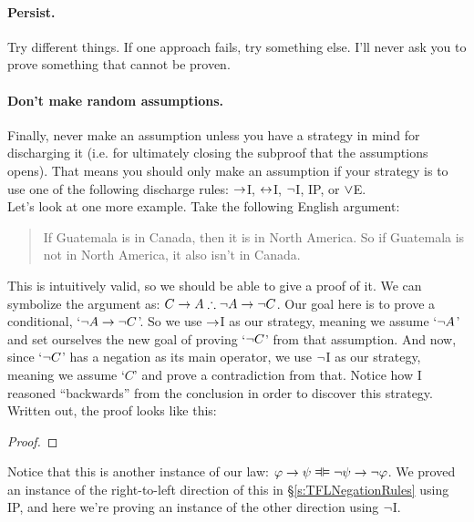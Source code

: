 \paragraph{Persist.}
Try different things. If one approach fails, try something else.  I'll never ask you to prove something that cannot be proven.

\paragraph{Don't make random assumptions.} Finally, never make an assumption unless you have a strategy in mind for discharging it (i.e. for ultimately closing the subproof that the assumptions opens).  That means you should only make an assumption if your strategy is to use one of the following discharge rules: $\rightarrow$I, $\leftrightarrow$I, $\neg$I, IP, or $\vee$E.\\


Let's look at one more example.  Take the following English argument:
\begin{quote}
If Guatemala is in Canada, then it is in North America. So if Guatemala is not in North America, it also isn't in Canada.
\end{quote}
This is intuitively valid, so we should be able to give a proof of it.  We can symbolize the argument as: $C \rightarrow A \therefore \neg A \rightarrow \neg C$.	Our goal here is to prove a conditional, `$\neg A \rightarrow \neg C$'.  So we use $\rightarrow$I as our strategy, meaning we assume `$\neg A$' and set ourselves the new goal of proving `$\neg C$' from that assumption.  And now, since `$\neg C$' has a negation as its main operator, we use $\neg$I as our strategy, meaning we assume `$C$' and prove a contradiction from that.  Notice how I reasoned ``backwards'' from the conclusion in order to discover this strategy.  Written out, the proof looks like this:


\begin{proof}
  
\open
	 
	\open
		 
		 
		 
	\close
	 
\close
{} 
\end{proof}

Notice that this is another instance of our  law: $\meta{\varphi} \eif \meta{\psi} \lequiv \enot \meta{\psi} \eif \enot \meta{\varphi}$.  We proved an instance of the right-to-left direction of this in \S\ref{s:TFLNegationRules} using IP, and here we're proving an instance of the other direction using $\neg$I.


